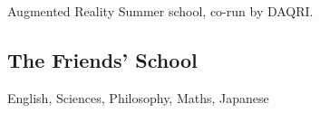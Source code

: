 \documentclass[a4paper]{deedy-resume} %
\begin{document}
\begin{minipage}[t]{0.33\textwidth}
Augmented Reality Summer school, co-run by DAQRI. \\

\sectionspace %


\subsection{The Friends' School}

English, Sciences, Philosophy, Maths, Japanese \\

\sectionspace %




\end{minipage}
\end{document}
